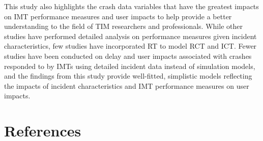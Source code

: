 \documentclass[
  letterpaper,
  authoryear]{elsarticle}
\begin{document}
This study also highlights the crash data variables that have the
greatest impacts on IMT performance measures and user impacts to help
provide a better understanding to the field of TIM researchers and
professionals. While other studies have performed detailed analysis on
performance measures given incident characteristics, few studies have
incorporated RT to model RCT and ICT. Fewer studies have been conducted
on delay and user impacts associated with crashes responded to by IMTs
using detailed incident data instead of simulation models, and the
findings from this study provide well-fitted, simplistic models
reflecting the impacts of incident characteristics and IMT performance
measures on user impacts.


\section*{References}\label{references}


\renewcommand{\bibsection}{}

\end{document}
